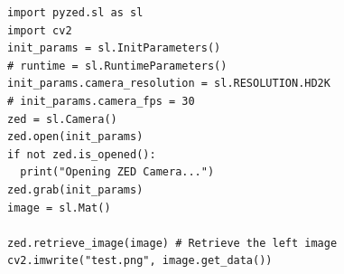 \documentclass[balance,upint,subscriptcorrection,varvw,nofoot, mathalfa=cal=boondoxo,spanish,french,vietnamese,russian,greek,pdf-a,fontspec,colorlinks]{asmeconf}
\begin{document}
\begin{verbatim} 
import pyzed.sl as sl
import cv2
init_params = sl.InitParameters()
# runtime = sl.RuntimeParameters()
init_params.camera_resolution = sl.RESOLUTION.HD2K
# init_params.camera_fps = 30
zed = sl.Camera()
zed.open(init_params)
if not zed.is_opened():
  print("Opening ZED Camera...")
zed.grab(init_params)
image = sl.Mat()

zed.retrieve_image(image) # Retrieve the left image
cv2.imwrite("test.png", image.get_data())
\end{verbatim} 

\end{document}
